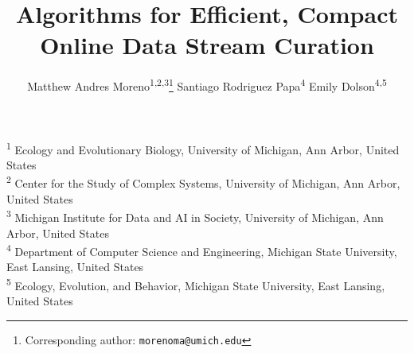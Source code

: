 \title{ Algorithms for Efficient, Compact Online Data Stream Curation }
\author{
    Matthew Andres Moreno\textsuperscript{1,2,3}\thanks{Corresponding author: \texttt{morenoma@umich.edu}} \quad
    Santiago Rodriguez Papa\textsuperscript{4} \quad
    Emily Dolson\textsuperscript{4,5} \quad
}
\date{}

\newcommand{\affil}[1]{\textsuperscript{#1}}
\newcommand{\affiliations}{
\affil{1} Ecology and Evolutionary Biology, University of Michigan, Ann Arbor, United States \\
\affil{2} Center for the Study of Complex Systems, University of Michigan, Ann Arbor, United States \\
\affil{3} Michigan Institute for Data and AI in Society, University of Michigan, Ann Arbor, United States \\
\affil{4} Department of Computer Science and Engineering, Michigan State University, East Lansing, United States \\
\affil{5} Ecology, Evolution, and Behavior, Michigan State University, East Lansing, United States \\
}

\maketitle

\begin{center}
\affiliations
\end{center}


